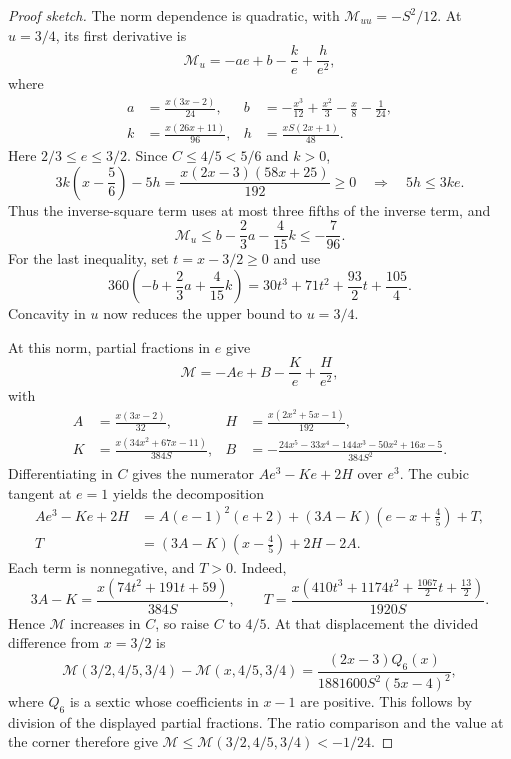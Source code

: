 \begin{proof}[Proof sketch]
The norm dependence is quadratic, with $\mathcal M_{uu}=-S^2/12$.
At $u=3/4$, its first derivative is
\[
 \mathcal M_u=-ae+b-\frac ke+\frac h{e^2},
\]
where
\begin{align*}
 a&=\frac{x(3x-2)}{24},&
 b&=-\frac{x^3}{12}+\frac{x^2}3-\frac x8-\frac1{24},\\
 k&=\frac{x(26x+11)}{96},&
 h&=\frac{xS(2x+1)}{48}.
\end{align*}
Here $2/3\le e\le3/2$. Since $C\le4/5<5/6$ and $k>0$,
\[
 3k\left(x-\frac56\right)-5h
   =\frac{x(2x-3)(58x+25)}{192}\ge0
 \quad\Longrightarrow\quad 5h\le3ke.
\]
Thus the inverse-square term uses at most three fifths of the inverse term,
and
\[
 \mathcal M_u\le b-\frac23a-\frac4{15}k\le-\frac7{96}.
\]
For the last inequality, set $t=x-3/2\ge0$ and use
\[
 360\left(-b+\frac23a+\frac4{15}k\right)
 =30t^3+71t^2+\frac{93}2t+\frac{105}4.
\]
Concavity in $u$ now reduces the upper bound to $u=3/4$.

At this norm, partial fractions in $e$ give
\[
 \mathcal M=-Ae+B-\frac Ke+\frac H{e^2},
\]
with
\begin{align*}
 A&=\frac{x(3x-2)}{32},&
 H&=\frac{x(2x^2+5x-1)}{192},\\
 K&=\frac{x(34x^2+67x-11)}{384S},&
 B&=-\frac{24x^5-33x^4-144x^3-50x^2+16x-5}{384S^2}.
\end{align*}
Differentiating in $C$ gives the numerator $Ae^3-Ke+2H$ over $e^3$.
The cubic tangent at $e=1$ yields the decomposition
\begin{align*}
 Ae^3-Ke+2H
 &=A(e-1)^2(e+2)
   +(3A-K)\left(e-x+\frac45\right)+T,\\
 T&=(3A-K)\left(x-\frac45\right)+2H-2A.
\end{align*}
Each term is nonnegative, and $T>0$. Indeed,
\[
 3A-K=\frac{x(74t^2+191t+59)}{384S},\qquad
 T=\frac{x(410t^3+1174t^2+\frac{1067}2t+\frac{13}2)}{1920S}.
\]
Hence $\mathcal M$ increases in $C$, so raise $C$ to $4/5$.
At that displacement the divided difference from $x=3/2$ is
\[
 \mathcal M(3/2,4/5,3/4)-\mathcal M(x,4/5,3/4)
 =\frac{(2x-3)Q_6(x)}{1881600S^2(5x-4)^2},
\]
where $Q_6$ is a sextic whose coefficients in $x-1$ are positive.
This follows by division of the displayed partial fractions.
The ratio comparison and the value at the corner therefore give
$\mathcal M\le\mathcal M(3/2,4/5,3/4)<-1/24$.


\end{proof}
